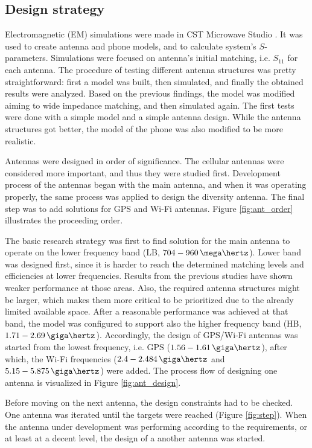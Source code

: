 \subsection{Design strategy}
\label{sec:process}
Electromagnetic (EM) simulations were made in CST Microwave Studio \cite{cst}. It was used to create antenna and phone models, and to calculate system's $S$-parameters. Simulations were focused on antenna's initial matching, i.e. $S_{11}$ for each antenna. The procedure of testing different antenna structures was pretty straightforward: first a model was built, then simulated, and finally the obtained results were analyzed. Based on the previous findings, the model was modified aiming to wide impedance matching, and then simulated again. The first tests were done with a simple model and a simple antenna design. While the antenna structures got better, the model of the phone was also modified to be more realistic.

Antennas were designed in order of significance. The cellular antennas were considered more important, and thus they were studied first. Development process of the antennas began with the main antenna, and when it was operating properly, the same process was applied to design the diversity antenna. The final step was to add solutions for GPS and Wi-Fi antennas. Figure \ref{fig:ant_order} illustrates the proceeding order. 

The basic research strategy was first to find solution for the main antenna to operate on the lower frequency band (LB, $704-960\,\mega\hertz$). Lower band was designed first, since it is harder to reach the determined matching levels and efficiencies at lower frequencies. Results from the previous studies have shown weaker performance at those areas. Also, the required antenna structures might be larger, which makes them more critical to be prioritized due to the already limited available space. After a reasonable performance was achieved at that band, the model was configured to support also the higher frequency band (HB, $1.71-2.69\,\giga\hertz$). Accordingly, the design of GPS/Wi-Fi antennas was started from the lowest frequency, i.e. GPS ($1.56-1.61\,\giga\hertz$), after which, the Wi-Fi frequencies ($2.4-2.484\,\giga\hertz$ and $5.15-5.875\,\giga\hertz$) were added. The process flow of designing one antenna is visualized in Figure \ref{fig:ant_design}.

Before moving on the next antenna, the design constraints had to be checked. One antenna was iterated until the targets were reached (Figure \ref{fig:step}). When the antenna under development was performing according to the requirements, or at least at a decent level, the design of a another antenna was started.

